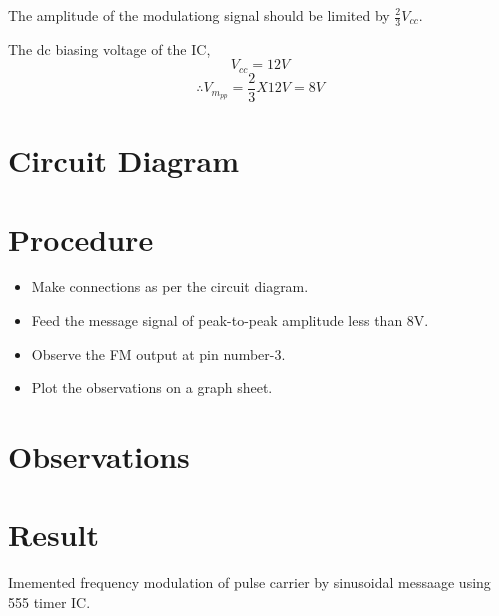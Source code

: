 The amplitude of the modulationg signal should be limited by $\frac{2}{3}V_{cc}$.

The dc biasing voltage of the IC, 
\begin{equation}
V_{cc}=12 V
\end{equation}
\begin{equation}
\therefore V_{m_{pp}}=\frac{2}{3}X12 V=8V
\end{equation}
\section*{Circuit Diagram}
\section*{Procedure}

\begin{itemize}
\item
Make connections as per the circuit diagram.

\item

Feed the message signal of peak-to-peak amplitude less than 8V.
\item Observe the FM output at pin number-3.

\item
Plot the observations on a graph sheet.
\end{itemize}


\section*{Observations}

\section*{Result}
Imemented frequency modulation of pulse carrier by sinusoidal messaage using 555 timer IC.




